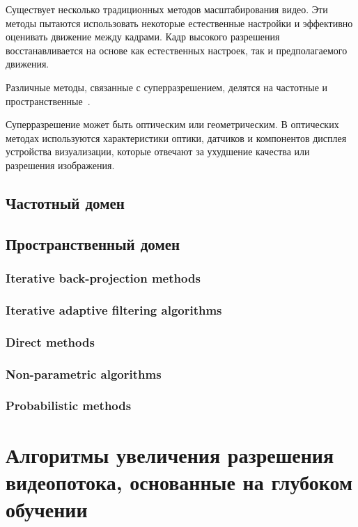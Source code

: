 \documentclass{bmstu}
\begin{document}
Существует несколько традиционных методов масштабирования видео. 
Эти методы пытаются использовать некоторые естественные настройки и эффективно оценивать движение между кадрами. 
Кадр высокого разрешения восстанавливается на основе как естественных настроек, так и предполагаемого движения.

Различные методы, связанные с суперразрешением, делятся на частотные и пространственные~\cite{Daithankar2021}.

Суперразрешение может быть оптическим или геометрическим. 
В оптических методах используются характеристики оптики, датчиков и компонентов дисплея устройства визуализации, которые отвечают за ухудшение качества или разрешения изображения. 

\section{Частотный домен}

\section{Пространственный домен}

\subsection{Iterative back-projection methods}

\subsection{Iterative adaptive filtering algorithms}

\subsection{Direct methods}

\subsection{Non-parametric algorithms}

\subsection{Probabilistic methods}

\chapter{Алгоритмы увеличения разрешения видеопотока, основанные на глубоком обучении}
\end{document}
